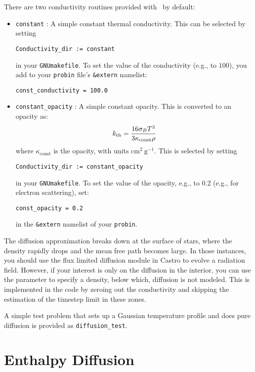 There are two conductivity routines provided with \castro\ by default:
\begin{itemize}
\item {\tt constant} : A simple constant thermal conductivity.  This can be 
  selected by setting 
\begin{verbatim}
Conductivity_dir := constant
\end{verbatim}
in your {\tt GNUmakefile}.  To set the value of the conductivity (e.g., to
$100$), you add to your {\tt probin} file's {\tt \&extern} namelist:
\begin{verbatim}
const_conductivity = 100.0
\end{verbatim}

\item {\tt constant\_opacity} : A simple constant opacity.  This is
  converted to an opacity as:
  \begin{equation}
    {k_\mathrm{th}} = \frac{16 \sigma_B T^3}{3 \kappa_\mathrm{const} \rho}
  \end{equation}
where $\kappa_\mathrm{const}$ is the opacity, with units $\mathrm{cm^2~g^{-1}}$.
This is selected by setting
\begin{verbatim}
Conductivity_dir := constant_opacity
\end{verbatim}
in your {\tt GNUmakefile}.  To set the value of the opacity, e.g., to
0.2 (e.g., for electron scattering), set:
\begin{verbatim}
const_opacity = 0.2
\end{verbatim}
in the {\tt \&extern} namelist of your {\tt probin}.

\end{itemize}

The diffusion approximation breaks down at the surface of stars,
where the density rapidly drops and the mean free path becomes 
large.  In those instances, you should use the flux limited diffusion
module in Castro to evolve a radiation field.  However, if your
interest is only on the diffusion in the interior, you can use
the  parameter to specify a density,
below which, diffusion is not modeled.  This is implemented in the
code by zeroing out the conductivity and skipping the estimation
of the timestep limit in these zones.

A simple test problem that sets up a Gaussian temperature profile 
and does pure diffusion is provided as {\tt diffusion\_test}.



\section{Enthalpy Diffusion}

